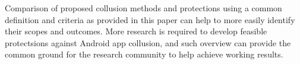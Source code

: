 \documentclass[article]{aaltoseries}
\begin{document}
Comparison of proposed collusion methods and protections using a common definition and criteria as provided in this paper can help to more easily identify their scopes and outcomes. More research is required to develop feasible protectsions against Android app collusion, and such overview can provide the common ground for the research community to help achieve working results. 




\end{document}
